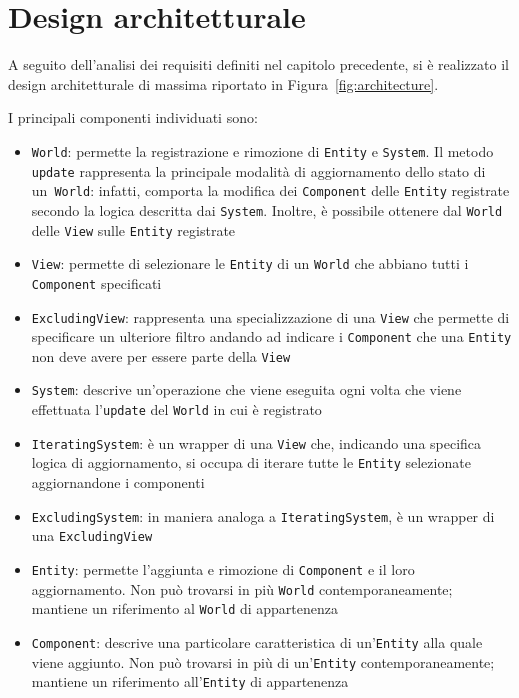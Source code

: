\chapter{Design architetturale}\label{ch:design-architetturale}
A seguito dell'analisi dei requisiti definiti nel capitolo precedente, si è realizzato il design architetturale
di massima riportato in Figura~\ref{fig:architecture}.

I principali componenti individuati sono:
\begin{itemize}
    \item \texttt{World}: permette la registrazione e rimozione di \texttt{Entity} e \texttt{System}.
    Il metodo \texttt{update} rappresenta la principale modalità di aggiornamento dello stato di un~\texttt{World}: infatti, comporta la modifica dei \texttt{Component} delle \texttt{Entity} registrate secondo la logica descritta dai \texttt{System}.
    Inoltre, è possibile ottenere dal \texttt{World} delle \texttt{View} sulle \texttt{Entity} registrate
    \item \texttt{View}: permette di selezionare le \texttt{Entity} di un \texttt{World} che abbiano tutti i \texttt{Component} specificati
    \item \texttt{ExcludingView}: rappresenta una specializzazione di una \texttt{View} che permette di specificare un ulteriore filtro andando ad indicare i \texttt{Component} che una \texttt{Entity} non deve avere per essere parte della \texttt{View}
    \item \texttt{System}: descrive un'operazione che viene eseguita ogni volta che viene effettuata l'\texttt{update} del \texttt{World} in cui è registrato
    \item \texttt{IteratingSystem}: è un wrapper di una \texttt{View} che, indicando una specifica logica di aggiornamento, si occupa di iterare tutte le \texttt{Entity} selezionate aggiornandone i componenti
    \item \texttt{ExcludingSystem}: in maniera analoga a \texttt{IteratingSystem}, è un wrapper di una \texttt{ExcludingView}
    \item \texttt{Entity}: permette l'aggiunta e rimozione di \texttt{Component} e il loro aggiornamento.
    Non può trovarsi in più \texttt{World} contemporaneamente;
    mantiene un riferimento al \texttt{World} di appartenenza
    \item \texttt{Component}: descrive una particolare caratteristica di un'\texttt{Entity} alla quale viene aggiunto.
    Non può trovarsi in più di un'\texttt{Entity} contemporaneamente;
    mantiene un riferimento all'\texttt{Entity} di appartenenza
\end{itemize}

